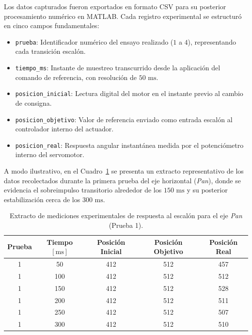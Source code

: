 \documentclass[12pt,a4paper]{article}
\begin{document}
Los datos capturados fueron exportados en formato CSV para su posterior procesamiento numérico en MATLAB. Cada registro experimental se estructuró en cinco campos fundamentales:
\begin{itemize}
    \item \texttt{prueba}: Identificador numérico del ensayo realizado ($1$ a $4$), representando cada transición escalón.
    \item \texttt{tiempo\_ms}: Instante de muestreo transcurrido desde la aplicación del comando de referencia, con resolución de $50\text{ ms}$.
    \item \texttt{posicion\_inicial}: Lectura digital del motor en el instante previo al cambio de consigna.
    \item \texttt{posicion\_objetivo}: Valor de referencia enviado como entrada escalón al controlador interno del actuador.
    \item \texttt{posicion\_real}: Respuesta angular instantánea medida por el potenciómetro interno del servomotor.
\end{itemize}

A modo ilustrativo, en el Cuadro~\ref{tab:muestra_csv} se presenta un extracto representativo de los datos recolectados durante la primera prueba del eje horizontal (\emph{Pan}), donde se evidencia el sobreimpulso transitorio alrededor de los $150\text{ ms}$ y su posterior estabilización cerca de los $300\text{ ms}$.

\begin{table}[H]
    \centering
    \caption{Extracto de mediciones experimentales de respuesta al escalón para el eje \emph{Pan} (Prueba 1).}
    \label{tab:muestra_csv}
    \begin{tabular}{ccccc}
        \toprule
        \textbf{Prueba} & \textbf{Tiempo $[\text{ms}]$} & \textbf{Posición Inicial} & \textbf{Posición Objetivo} & \textbf{Posición Real} \\
        \midrule
        1 & 50  & 412 & 512 & 457 \\
        1 & 100 & 412 & 512 & 512 \\
        1 & 150 & 412 & 512 & 528 \\
        1 & 200 & 412 & 512 & 511 \\
        1 & 250 & 412 & 512 & 507 \\
        1 & 300 & 412 & 512 & 510 \\
        \bottomrule
    \end{tabular}
\end{table}
\end{document}
